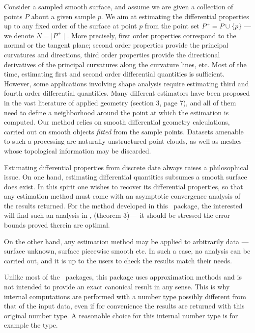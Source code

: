 Consider a sampled smooth surface, and assume we are given a
collection of points $P$ about a given sample $p$. We aim at
estimating the differential properties up to any fixed order of the
surface at point $p$ from the point set $P^+ = P\cup \{ p\}$ --- we
denote $N=\mid P^+\mid$. More precisely, first order properties
correspond to the normal or the tangent plane; second order properties
provide the principal curvatures and directions, third order
properties provide the directional derivatives of the principal
curvatures along the curvature lines, etc.  Most of the time,
estimating first and second order differential quantities is
sufficient.  However, some applications involving shape analysis
require estimating third and fourth order differential quantities.
Many different estimators have been proposed in the vast literature of
applied geometry \cite{cgal:p-smrqt-01} (section 3, page 7), and all
of them need to define a neighborhood around the point at which the
estimation is computed.  Our method relies on smooth differential
geometry calculations, carried out on smooth objects {\em fitted} from
the sample points. 
Datasets amenable to such a processing are naturally unstructured
point clouds, as well as meshes ---whose topological information may
be discarded.

Estimating differential properties from discrete date always raises a
philosophical issue.
On one hand, estimating differential quantities subsumes a smooth
surface does exist.
In this spirit one wishes to recover its differential
properties, so that any estimation method must come with an
asymptotic convergence analysis of the results returned. For the
method developed in this \cgal\ package, the
interested will find such an analysis in
\cite{cgal:cp-edqpf-05}, (theorem 3)---\ it should be stressed 
the error bounds proved therein are optimal.

On the other hand, any estimation method may be applied to arbitrarily
data ---surface unknown, surface piecewise smooth etc. In such a case,
no analysis can be carried out, and it is up to the users to check the
results match their needs.


Unlike most of the \cgal\ packages, this package uses approximation
methods and is not intended to provide an exact canonical result in
any sense. This is why internal computations are performed with a
number type possibly different from that of the input data, even if
for convenience the results are returned with this original number
type. A reasonable choice for this internal number type is for example
the  type.

